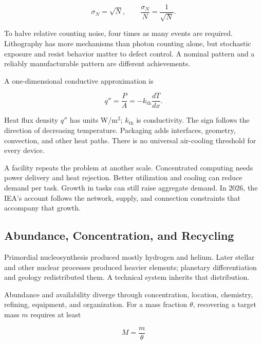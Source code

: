 \begin{equation}
\sigma_N=\sqrt N,\qquad \frac{\sigma_N}{N}=\frac{1}{\sqrt N}.
\end{equation}

To halve relative counting noise, four times as many events are required. Lithography has more mechanisms than photon counting alone, but stochastic exposure and resist behavior matter to defect control.\cite{debisschop2018stochastic} A nominal pattern and a reliably manufacturable pattern are different achievements.


A one-dimensional conductive approximation is

\begin{equation}
q''=\frac{P}{A}=-k_{\mathrm{th}}\frac{dT}{dx}.
\end{equation}

Heat flux density $q''$ has units W/m$^2$; $k_{\mathrm{th}}$ is conductivity. The sign follows the direction of decreasing temperature. Packaging adds interfaces, geometry, convection, and other heat paths. There is no universal air-cooling threshold for every device.

A facility repeats the problem at another scale. Concentrated computing needs power delivery and heat rejection. Better utilization and cooling can reduce demand per task.\cite{masanet2020recalibrating} Growth in tasks can still raise aggregate demand. In 2026, the IEA's account follows the network, supply, and connection constraints that accompany that growth.\cite{iea2026powering}

\subsection{Abundance, Concentration, and Recycling}


Primordial nucleosynthesis produced mostly hydrogen and helium. Later stellar and other nuclear processes produced heavier elements; planetary differentiation and geology redistributed them.\cite{steigman2007primordial,alpher1948origin,rudnick2003composition} A technical system inherits that distribution.

Abundance and availability diverge through concentration, location, chemistry, refining, equipment, and organization. For a mass fraction $\theta$, recovering a target mass $m$ requires at least

\begin{equation}
M=\frac{m}{\theta}
\end{equation}

